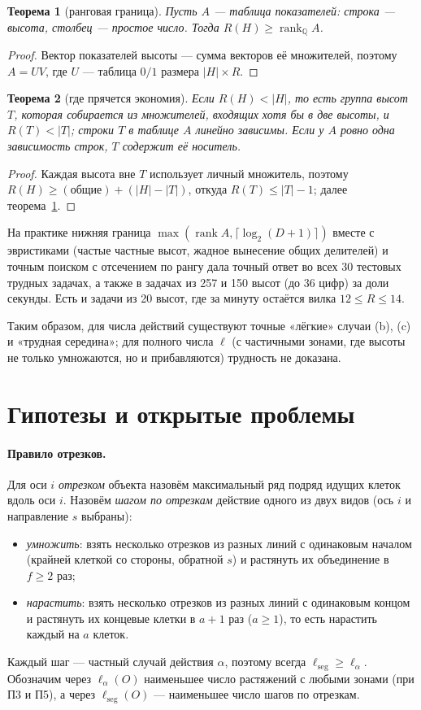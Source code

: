 \documentclass[11pt,a4paper]{article}
\theoremstyle{plain}
\newtheorem{theorem}{Теорема}
\theoremstyle{definition}
\theoremstyle{remark}
\begin{document}
\begin{theorem}[ранговая граница]\label{thm:rank}
Пусть $A$ — таблица показателей: строка — высота, столбец — простое число. Тогда $R(H)\ge\operatorname{rank}_{\mathbb Q}A$.
\end{theorem}
\begin{proof}
Вектор показателей высоты — сумма векторов её множителей, поэтому $A=UV$, где $U$ — таблица $0/1$ размера $|H|\times R$.
\end{proof}

\begin{theorem}[где прячется экономия]\label{thm:tree}
Если $R(H)<|H|$, то есть группа высот $T$, которая собирается из множителей, входящих хотя бы в две высоты, и $R(T)<|T|$; строки $T$ в таблице $A$ линейно зависимы. Если у $A$ ровно одна зависимость строк, $T$ содержит её носитель.
\end{theorem}
\begin{proof}
Каждая высота вне $T$ использует личный множитель, поэтому $R(H)\ge(\text{общие})+(|H|-|T|)$, откуда $R(T)\le|T|-1$; далее теорема~\ref{thm:rank}.
\end{proof}

На практике нижняя граница $\max(\operatorname{rank}A,\lceil\log_2(D+1)\rceil)$ вместе с эвристиками (частые частные высот, жадное вынесение общих делителей) и точным поиском с отсечением по рангу дала точный ответ во всех 30 тестовых трудных задачах, а также в задачах из 257 и 150 высот (до 36 цифр) за доли секунды. Есть и задачи из 20 высот, где за минуту остаётся вилка $12\le R\le 14$.

Таким образом, для числа действий существуют точные «лёгкие» случаи (b), (c) и «трудная середина»; для полного числа $\ell$ (с частичными зонами, где высоты не только умножаются, но и прибавляются) трудность не доказана.

\section{Гипотезы и открытые проблемы}\label{sec:conj}

\paragraph{Правило отрезков.} Для оси $i$ \emph{отрезком} объекта назовём максимальный ряд подряд идущих клеток вдоль оси $i$. Назовём \emph{шагом по отрезкам} действие одного из двух видов (ось $i$ и направление $s$ выбраны):
\begin{itemize}
\item \emph{умножить}: взять несколько отрезков из разных линий с одинаковым началом (крайней клеткой со стороны, обратной $s$) и растянуть их объединение в $f\ge2$ раз;
\item \emph{нарастить}: взять несколько отрезков из разных линий с одинаковым концом и растянуть их концевые клетки в $a+1$ раз ($a\ge1$), то есть нарастить каждый на $a$ клеток.
\end{itemize}
Каждый шаг — частный случай действия $\alpha$, поэтому всегда $\ell_{\mathrm{seg}}\ge\ell_\alpha$. Обозначим через $\ell_{\alpha}(O)$ наименьшее число растяжений с любыми зонами (при П3 и П5), а через $\ell_{\mathrm{seg}}(O)$ — наименьшее число шагов по отрезкам.
\end{document}
